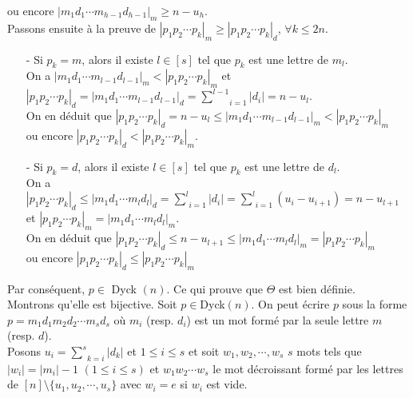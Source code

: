 ou encore $| m_{1}d_{1}\cdots m_{h-1}d_{h-1} |_{m}\geq n-u_{h}$.\\
Passons ensuite à la preuve de $|p_{1}p_{2}\cdots p_{k}|_{m}\geq |p_{1}p_{2}\cdots p_{k}|_{d}$, $\forall k\leq 2n$.
\begin{itemize}
	\item [-] Si $p_{k}=m$, alors il existe $l\in [s]$ tel que $p_{k}$ est une lettre de $m_{l}$.\\ On a $|m_{1}d_{1}\cdots m_{l-1}d_{l-1}|_{m}<|p_{1}p_{2}\cdots p_{k}|_{m}$ et $|p_{1}p_{2}\cdots p_{k}|_{d}=|m_{1}d_{1}\cdots m_{l-1}d_{l-1}|_{d}=\underset{i=1}{\overset{l-1}{\sum}}|d_{i}|=n-u_{l}$.\\
	      On en déduit que $|p_{1}p_{2}\cdots p_{k}|_{d}=n-u_{l}\leq | m_{1}d_{1}\cdots m_{l-1}d_{l-1} |_{m} <|p_{1}p_{2}\cdots p_{k}|_{m}$ \\ ou encore $|p_{1}p_{2}\cdots p_{k}|_{d}<|p_{1}p_{2}\cdots p_{k}|_{m}$.

	\item [-] Si $p_{k}=d$, alors il existe $l\in[s]$ tel que $p_{k}$ est une lettre de $d_{l}$.\\ On a $|p_{1}p_{2}\cdots p_{k}|_{d}\leq |m_{1}d_{1}\cdots m_{l}d_{l}|_{d}=\underset{i=1}{\overset{l}{\sum}}|d_{i}|= \underset{i=1}{\overset{l}{\sum}}(u_{i}-u_{i+1})=n-u_{l+1}$ et $|p_{1}p_{2}\cdots p_{k}|_{m}=|m_{1}d_{1}\cdots m_{l}d_{l}|_{m}$.\\
	      On en déduit que $|p_{1}p_{2}\cdots p_{k}|_{d}\leq n-u_{l+1} \leq |m_{1}d_{1}\cdots m_{l}d_{l}|_{m} =|p_{1}p_{2}\cdots p_{k}|_{m}$ \\ou encore $|p_{1}p_{2}\cdots p_{k}|_{d} \leq|p_{1}p_{2}\cdots p_{k}|_{m}$\vspace{7pt}
\end{itemize}
Par conséquent, $p\in $\rm{ Dyck }$(n)$. Ce qui prouve que $\Theta$ est bien définie.\vspace{10pt}\\
Montrons qu'elle est bijective. Soit $p\in $\rm{Dyck}$(n)$. On peut écrire $p$ sous la forme $p=m_{1}d_{1}m_{2}d_{2}\cdots m_{s}d_{s}$ où $m_{i}$ (resp. $d_{i}$) est un mot formé par la seule lettre $m$ (resp. $d$).\\
Posons $u_{i}=\underset{k=i}{\overset{s}{\sum}}|d_{k}|$ et $1\leq i \leq s$ et soit $w_{1}, w_{2}, \cdots, w_{s}$ $s$ mots tels que $|w_{i}| = |m_{i}| - 1$ $(1\leq i \leq s)$ et $w_{1}w_{2}\cdots w_{s}$ le mot décroissant formé par les lettres de $[n]\setminus \{u_1, u_{2}, \cdots, u_{s}\}$ avec $w_i = e$ si $w_i$ est vide.\\
